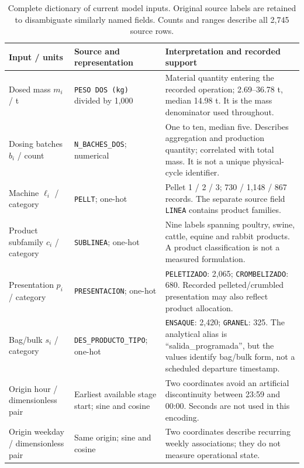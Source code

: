 \begin{table}[!htbp]\centering\small
\caption{Complete dictionary of current model inputs. Original source labels are retained to disambiguate similarly named fields. Counts and ranges describe all 2,745 source rows.}\label{tab:inputs}
\begin{tabularx}{\linewidth}{@{}p{.20\linewidth}p{.24\linewidth}X@{}}\toprule
Input / units & Source and representation & Interpretation and recorded support \\\midrule
Dosed mass $m_i$ / t & \texttt{PESO DOS (kg)} divided by 1,000 & Material quantity entering the recorded operation; 2.69--36.78 t, median 14.98 t. It is the mass denominator used throughout. \\\addlinespace
Dosing batches $b_i$ / count & \texttt{N\_BACHES\_DOS}; numerical & One to ten, median five. Describes aggregation and production quantity; correlated with total mass. It is not a unique physical-cycle identifier. \\\addlinespace
Machine $\ell_i$ / category & \texttt{PELLT}; one-hot & Pellet 1 / 2 / 3; 730 / 1,148 / 867 records. The separate source field \texttt{LINEA} contains product families. \\\addlinespace
Product subfamily $c_i$ / category & \texttt{SUBLINEA}; one-hot & Nine labels spanning poultry, swine, cattle, equine and rabbit products. A product classification is not a measured formulation. \\\addlinespace
Presentation $p_i$ / category & \texttt{PRESENTACION}; one-hot & \texttt{PELETIZADO}: 2,065; \texttt{CROMBELIZADO}: 680. Recorded pelleted/crumbled presentation may also reflect product allocation. \\\addlinespace
Bag/bulk $s_i$ / category & \texttt{DES\_PRODUCTO\_TIPO}; one-hot & \texttt{ENSAQUE}: 2,420; \texttt{GRANEL}: 325. The analytical alias is ``salida\_programada'', but the values identify bag/bulk form, not a scheduled departure timestamp. \\\addlinespace
Origin hour / dimensionless pair & Earliest available stage start; sine and cosine & Two coordinates avoid an artificial discontinuity between 23:59 and 00:00. Seconds are not used in this encoding. \\\addlinespace
Origin weekday / dimensionless pair & Same origin; sine and cosine & Two coordinates describe recurring weekly associations; they do not measure operational state. \\\bottomrule
\end{tabularx}\end{table}
